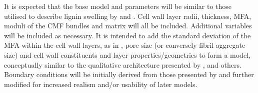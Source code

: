 It is expected that the base model and parameters will be similar to those
utilised to describe lignin swelling by \citet{Alm_ras_2005} and \citet{Yamamoto_1998}. Cell wall layer radii, thickness, MFA, moduli of the CMF bundles and matrix will all be included. Additional variables will be included
as necessary. It is intended to add the standard deviation of the MFA within the
cell wall layers, as in \citet{Harrington_1998}, pore size (or conversely fibril
aggregate size) \citep{Fahl_n_2005,Chang_2014,BIORESBioRes_07_1_0521_Salmen_OSSR_Struc_Organis_Wood_Polymers,Kim_2011} and cell wall
constituents \citep{Baba_2009,Donaldson_2001} and layer properties/geometries
\citep{Bergander_2002,grozdits1984differentiation,Alm_ras_2005,Yamamoto_1998,Chang_2014,ISI:A1995QJ03000001} to form a model, conceptually similar to the qualitative
architecture presented by \citet{Mellerowicz_2011}, \citet{Salm_n_2009} and others. Boundary conditions will be initially derived from those
presented by \citet{Alm_ras_2005} and further modified for increased realism
and/or usability of later models.
